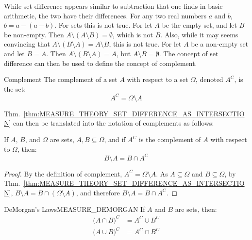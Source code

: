 \documentclass[crop=false,class=book,oneside]{standalone}
\begin{document}
            While set difference appears similar to subtraction that one finds in
            basic arithmetic, the two have their differences. For any two real
            numbers $a$ and $b$, $b=a-(a-b)$. For sets this is not true. For let
            $A$ be the empty set, and let $B$ be non-empty. Then
            $A\setminus(A\setminus{B})=\emptyset$, which is not $B$.
            Also, while it may seems convincing that
            $A\setminus(B\setminus{A})=A\setminus{B}$, this is not true. For
            let $A$ be a non-empty set and let $B=A$. Then
            $A\setminus(B\setminus{A})=A$, but $A\setminus{B}=\emptyset$.
            The concept of set difference can then be used to define the
            concept of complement.
            \begin{ldefinition}{Complement}
                The complement of a set $A$ with respect to a set
                $\Omega$, denoted $A^{C}$, is the set:
                \begin{equation}
                    A^{C}=\Omega\setminus{A}
                \end{equation}
            \end{ldefinition}
            Thm.~\ref{thm:MEASURE_THEORY_SET_DIFFERENCE_AS_INTERSECTION} can then
            be translated into the notation of complements as follows:
            \begin{theorem}
                If $A$, $B$, and $\Omega$ are sets, $A,B\subseteq\Omega$,
                and if $A^{C}$ is the complement of $A$ with respect
                to $\Omega$, then:
                \begin{equation}
                    B\setminus{A}=B\cap{A}^{C}
                \end{equation}
            \end{theorem}
            \begin{proof}
                By the definition of complement, $A^{C}=\Omega\setminus{A}$.
                As $A\subseteq\Omega$ and $B\subseteq\Omega$, by
                Thm.~\ref{thm:MEASURE_THEORY_SET_DIFFERENCE_AS_INTERSECTION},
                $B\setminus{A}=B\cap(\Omega\setminus{A})$, and therefore
                $B\setminus{A}=B\cap{A}^{C}$.
            \end{proof}
            \begin{ftheorem}{DeMorgan's Laws}{MEASURE_DEMORGAN}
                If $A$ and $B$ are sets, then:
                \begin{subequations}
                    \begin{align}
                        \big(A\cap{B}\big)^{C}
                        &=A^{C}\cup{B}^{C}\\
                        \big(A\cup{B}\big)^{C}
                        &=A^{C}\cap{B}^{C}
                    \end{align}
                \end{subequations}
            \end{ftheorem}
\end{document}
